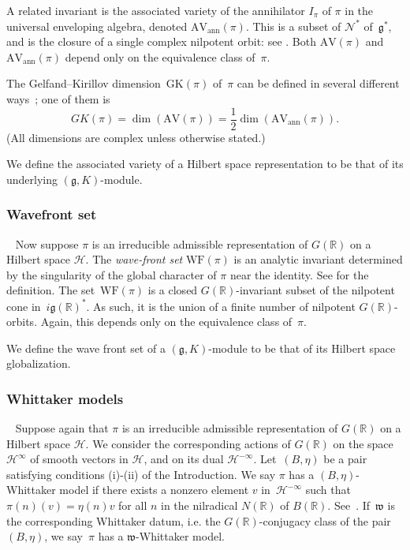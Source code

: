 \documentclass[cupthm]{CUP-JNL-JMJ}
\numberwithin{equation}{section}
\theoremstyle{cupplain}
\theoremstyle{cupdefinition}
\theoremstyle{cupremark}
\theoremstyle{cupproof}
\newcommand{\mH}{\mathcal H}
\newcommand{\R}{\mathbb R}
\newcommand{\N}{\mathcal N}
\newcommand{\g}{\mathfrak g}
\newcommand{\w}{\mathfrak w}
\newcommand{\AV}{\mathrm{AV}}
\newcommand{\WF}{\mathrm{WF}}
\newcommand{\AVann}{\mathrm{AV}_{\mathrm{ann}}}
\newcommand{\GK}{\mathrm{GK}}
\begin{document}
A related invariant is the associated variety of the annihilator $I_\pi$ of $\pi$ in the universal enveloping algebra, 
denoted $\AVann(\pi)$.
This is a subset of $\N^*$ of~$\g^*$, and is the closure of a single complex nilpotent orbit: see \cite[Section 1, Theorem~4.7]{vogan_bowdoin}. Both $\AV(\pi)$ and $\AVann(\pi)$ depend only on the equivalence class of~$\pi$.

The Gelfand--Kirillov dimension~$\GK(\pi)$ of~$\pi$ can be defined in several different ways~\cite{vogan-gelfand-kirillov}; one of them is
$$
GK(\pi)=\dim(\AV(\pi))=\frac12\dim(\AVann(\pi)).
$$
(All dimensions are complex unless otherwise stated.)


We define the associated variety of a Hilbert space representation to be that of  its underlying $(\g,K)$-module.


\subsubsection{Wavefront set}~
Now suppose $\pi$ is an irreducible admissible representation of $G(\R)$ on a Hilbert space $\mH$. 
The \emph{wave-front
  set} $\WF(\pi)$ is an analytic invariant determined by the
singularity of the global character of $\pi$ near the identity. See \cite{howe_wave_front, bv_local_structure, HarrisHeOlafsson} for the definition. 
The set~$\WF(\pi)$  is a closed $G(\R)$-invariant subset of the nilpotent cone in~$i\g(\R)^*$. As such, it is the union of a finite number of nilpotent $G(\R)$-orbits. Again, this depends only on the equivalence class of~$\pi$.

We define the wave front set of a $(\g,K)$-module to be that of its 
Hilbert space globalization. 

\subsubsection{Whittaker models}~
Suppose again that $\pi$ is an irreducible admissible representation of $G(\R)$ on a Hilbert space $\mH$. We consider the corresponding actions of $G(\R)$ on the space~$\mH^\infty$ of smooth vectors in $\mH$, and on its dual $\mH^{-\infty}$. Let~$(B, \eta)$ be a pair satisfying conditions (i)-(ii) of the Introduction. We say $\pi$ has a $(B,\eta)$-Whittaker model
if there exists a nonzero element $v$ in~$\mH^{-\infty}$ such that $\pi(n)(v)=\eta(n)v$ for all $n$ in the nilradical $N(\R)$ of $B(\R)$. See~\cite{matumoto}. If~$\w$ is the corresponding Whittaker datum, i.e. the $G(\R)$-conjugacy class of the pair $(B, \eta)$, we say~$\pi$ has a $\w$-Whittaker model.  
\end{document}
